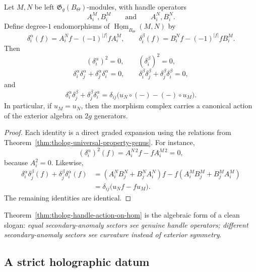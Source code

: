 \begin{theorem}
\label{thm:tholog-handle-action-on-hom}
Let \(M,N\) be left \(\mathfrak{G}_{g}(B_{\Theta})\)-modules, with handle operators
\[
A_{i}^{M},B_{i}^{M}
\qquad\text{and}\qquad
A_{i}^{N},B_{i}^{N}.
\]
Define degree-\(1\) endomorphisms of \(\underline{\operatorname{Hom}}_{B_{\Theta}}(M,N)\) by
\[
\delta_{i}^{\alpha}(f)=A_{i}^{N}f-(-1)^{|f|}fA_{i}^{M},
\qquad
\delta_{i}^{\beta}(f)=B_{i}^{N}f-(-1)^{|f|}fB_{i}^{M}.
\]
Then
\[
(\delta_{i}^{\alpha})^{2}=0,\qquad
(\delta_{i}^{\beta})^{2}=0,
\]
\[
\delta_{i}^{\alpha}\delta_{j}^{\alpha}+\delta_{j}^{\alpha}\delta_{i}^{\alpha}=0,
\qquad
\delta_{i}^{\beta}\delta_{j}^{\beta}+\delta_{j}^{\beta}\delta_{i}^{\beta}=0,
\]
and
\[
\delta_{i}^{\alpha}\delta_{j}^{\beta}+\delta_{j}^{\beta}\delta_{i}^{\alpha}
=
\delta_{ij}\big(u_{N}\circ(-)-(-)\circ u_{M}\big).
\]
In particular, if \(u_{M}=u_{N}\), then the morphism complex carries a canonical action of the exterior algebra on \(2g\) generators.
\end{theorem}

\begin{proof}
Each identity is a direct graded expansion using the relations from Theorem~\ref{thm:tholog-universal-property-genus}.
For instance,
\[
(\delta_{i}^{\alpha})^{2}(f)=A_{i}^{N\,2}f-fA_{i}^{M\,2}=0,
\]
because \(A_{i}^{2}=0\).
Likewise,
\begin{align*}
\delta_{i}^{\alpha}\delta_{j}^{\beta}(f)+\delta_{j}^{\beta}\delta_{i}^{\alpha}(f)
&=
(A_{i}^{N}B_{j}^{N}+B_{j}^{N}A_{i}^{N})f
-
f(A_{i}^{M}B_{j}^{M}+B_{j}^{M}A_{i}^{M})
\\
&=
\delta_{ij}\big(u_{N}f-fu_{M}\big).
\end{align*}
The remaining identities are identical.
\end{proof}

\begin{remark}
\label{rem:tholog-qualitative-picture}
Theorem~\ref{thm:tholog-handle-action-on-hom} is the algebraic form of a clean slogan:
\emph{equal secondary-anomaly sectors see genuine handle operators; different secondary-anomaly sectors see curvature instead of exterior symmetry}.
\end{remark}

\subsection{A strict holographic datum}
\label{subsec:tholog-strict-holographic-datum}

